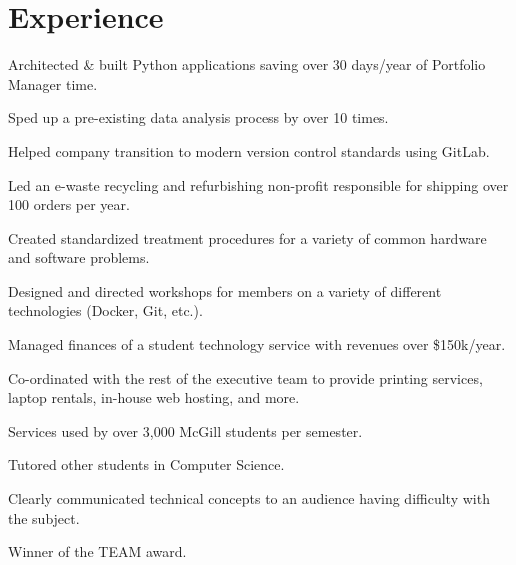 \documentclass[]{willguthrie-resume}
\begin{document}
\begin{minipage}[t]{0.66\textwidth}

	\vspace{\topsep}
	\section{Experience}

	\vspace{\topsep} %
	\begin{tightemize}
		\item Architected \& built Python applications saving over 30 days/year of Portfolio Manager time.
		\item Sped up a pre-existing data analysis process by over 10 times.
		\item Helped company transition to modern version control standards using GitLab.
	\end{tightemize}

	\begin{tightemize}
		\item Led an e-waste recycling and refurbishing non-profit responsible for shipping over 100 orders per year.
		\item Created standardized treatment procedures for a variety of common hardware and software problems.
		\item Designed and directed workshops for members on a variety of different technologies (Docker, Git, etc.).
	\end{tightemize}

	\begin{tightemize}
		\item Managed finances of a student technology service with revenues over \$150k/year.
		\item Co-ordinated with the rest of the executive team to provide printing services, laptop rentals, in-house web hosting, and more.
		\item Services used by over 3,000 McGill students per semester.
	\end{tightemize}

	\begin{tightemize}
		\item Tutored other students in Computer Science.
		\item Clearly communicated technical concepts to an audience having difficulty with the subject. 
		\item Winner of the TEAM award.
	\end{tightemize}


\end{minipage}
\end{document}
